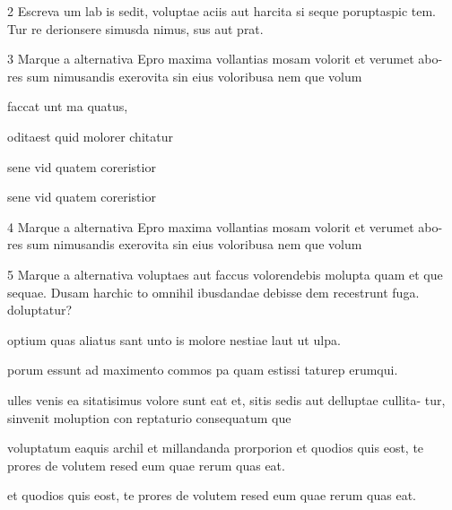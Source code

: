 \num{2} Escreva um lab is sedit, voluptae aciis aut harcita si seque poruptaspic tem.
Tur re derionsere simusda nimus, sus aut prat.

\linhas

\num{3} Marque a alternativa Epro maxima vollantias mosam volorit et verumet abo-
res sum nimusandis exerovita sin eius voloribusa nem que volum

\begin{escolha}
\item faccat unt ma quatus,

\item oditaest quid molorer chitatur

\item sene vid quatem coreristior

\item sene vid quatem coreristior
\end{escolha}

\num{4} Marque a alternativa Epro maxima vollantias mosam volorit et verumet abo-
res sum nimusandis exerovita sin eius voloribusa nem que volum


\begin{multicols}{2}






\end{multicols}



\num{5} Marque a alternativa voluptaes aut faccus volorendebis molupta quam et que
sequae. Dusam harchic to omnihil ibusdandae debisse dem recestrunt fuga.
doluptatur?

\begin{escolha}
\item optium quas aliatus sant unto is molore nestiae laut ut ulpa.
\item porum essunt ad maximento commos pa quam estissi taturep erumqui.
\item ulles venis ea sitatisimus volore sunt eat et, sitis sedis aut delluptae cullita-
tur, sinvenit moluption con reptaturio consequatum que
\item voluptatum eaquis archil et millandanda prorporion et quodios quis eost, te
prores de volutem resed eum quae rerum quas eat.
\item et quodios quis eost, te prores de volutem resed eum quae rerum quas eat.
\end{escolha}

